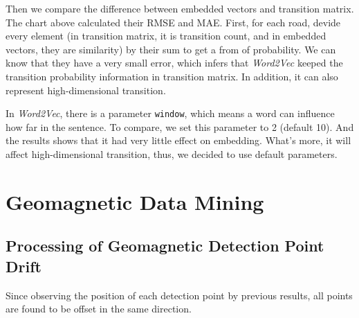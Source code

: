 \documentclass[fontset=none]{ctexart}
\theoremstyle{definition}
\theoremstyle{remark}
\begin{document}
\begin{figure}[h]
  \centering
  \quad
\end{figure}
Then we compare the difference between embedded vectors and transition matrix.
The chart above calculated their RMSE and MAE. First, for each road, devide every element (in transition matrix, it is transition count, and in embedded vectors, they are similarity) by their sum to get a from of probability.
We can know that they have a very small error, which infers that \textit{Word2Vec} keeped the transition probability information in transition matrix.
In addition, it can also represent high-dimensional transition.

In \textit{Word2Vec}, there is a parameter \texttt{window}, which means a word can influence how far in the sentence.
To compare, we set this parameter to 2 (default 10). And the results shows that it had very little effect on embedding.
What's more, it will affect high-dimensional transition, thus, we decided to use default parameters.


\clearpage
\section{Geomagnetic Data Mining}
\subsection{Processing of Geomagnetic Detection Point Drift}
Since observing the position of each detection point by previous results, all points are found to be offset in the same direction.
\end{document}
